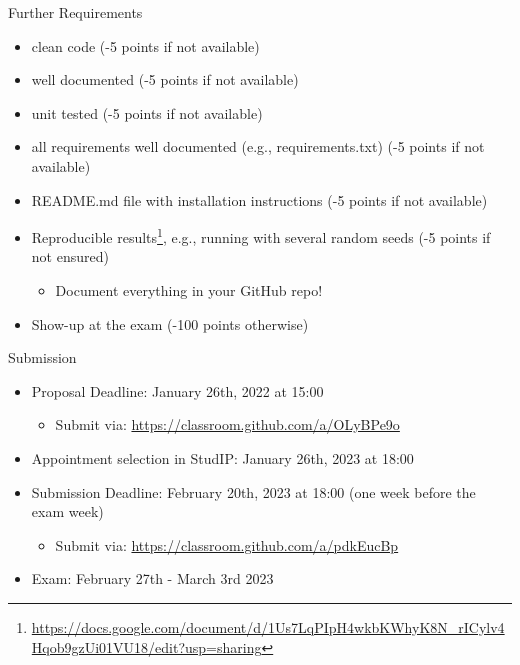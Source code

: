 \documentclass[aspectratio=169]{../latex_main/tntbeamer}  %
\begin{document}
\begin{frame}[c]{Further Requirements}
 
	\begin{itemize}
		\item clean code (-5 points if not available)
		\item well documented (-5 points if not available)
		\item unit tested (-5 points if not available)
		\item all requirements well documented (e.g., requirements.txt) (-5 points if not available)
		\item README.md file with installation instructions (-5 points if not available)
		\item Reproducible results\footnote{\url{https://docs.google.com/document/d/1Us7LqPIpH4wkbKWhyK8N_rICylv4Hqob9gzUi01VU18/edit?usp=sharing}}, e.g., running with several random seeds (-5 points if not ensured)
            \begin{itemize}
                \item Document everything in your GitHub repo!
            \end{itemize}
		\item Show-up at the exam (-100 points otherwise)
	\end{itemize}
	
\end{frame}

\begin{frame}[c]{Submission}
    \begin{itemize}
        \item Proposal Deadline: January 26th, 2022 at 15:00
        \begin{itemize}
            \item Submit via: \url{https://classroom.github.com/a/OLyBPe9o}
        \end{itemize}
        \item Appointment selection in StudIP: January 26th, 2023 at 18:00
        \item Submission Deadline: February 20th, 2023 at 18:00 (one week before the exam week)
        \begin{itemize}
            \item Submit via: \url{https://classroom.github.com/a/pdkEucBp}
        \end{itemize}
        \item Exam: February 27th - March 3rd 2023
    \end{itemize}
\end{frame}
\end{document}
